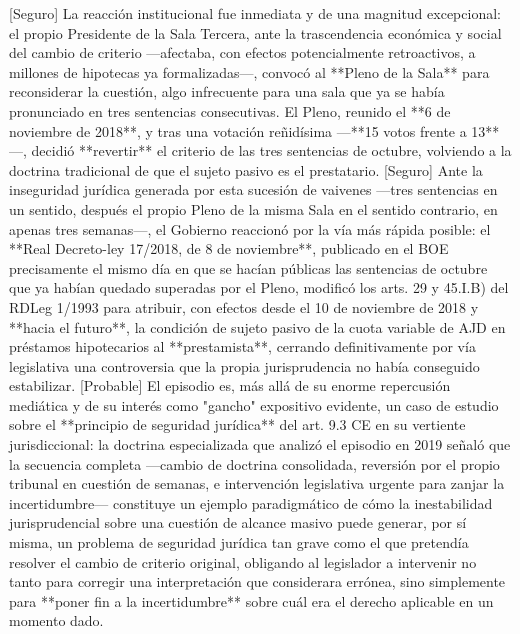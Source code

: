 \documentclass[10pt,a4paper]{article}
\begin{document}
[Seguro] La reacción institucional fue inmediata y de una magnitud excepcional: el propio Presidente de la Sala Tercera, ante la trascendencia económica y social del cambio de criterio —afectaba, con efectos potencialmente retroactivos, a millones de hipotecas ya formalizadas—, convocó al **Pleno de la Sala** para reconsiderar la cuestión, algo infrecuente para una sala que ya se había pronunciado en tres sentencias consecutivas. El Pleno, reunido el **6 de noviembre de 2018**, y tras una votación reñidísima —**15 votos frente a 13**—, decidió **revertir** el criterio de las tres sentencias de octubre, volviendo a la doctrina tradicional de que el sujeto pasivo es el prestatario. [Seguro] Ante la inseguridad jurídica generada por esta sucesión de vaivenes —tres sentencias en un sentido, después el propio Pleno de la misma Sala en el sentido contrario, en apenas tres semanas—, el Gobierno reaccionó por la vía más rápida posible: el **Real Decreto-ley 17/2018, de 8 de noviembre**, publicado en el BOE precisamente el mismo día en que se hacían públicas las sentencias de octubre que ya habían quedado superadas por el Pleno, modificó los arts. 29 y 45.I.B) del RDLeg 1/1993 para atribuir, con efectos desde el 10 de noviembre de 2018 y **hacia el futuro**, la condición de sujeto pasivo de la cuota variable de AJD en préstamos hipotecarios al **prestamista**, cerrando definitivamente por vía legislativa una controversia que la propia jurisprudencia no había conseguido estabilizar. [Probable] El episodio es, más allá de su enorme repercusión mediática y de su interés como "gancho" expositivo evidente, un caso de estudio sobre el **principio de seguridad jurídica** del art. 9.3 CE en su vertiente jurisdiccional: la doctrina especializada que analizó el episodio en 2019 señaló que la secuencia completa —cambio de doctrina consolidada, reversión por el propio tribunal en cuestión de semanas, e intervención legislativa urgente para zanjar la incertidumbre— constituye un ejemplo paradigmático de cómo la inestabilidad jurisprudencial sobre una cuestión de alcance masivo puede generar, por sí misma, un problema de seguridad jurídica tan grave como el que pretendía resolver el cambio de criterio original, obligando al legislador a intervenir no tanto para corregir una interpretación que considerara errónea, sino simplemente para **poner fin a la incertidumbre** sobre cuál era el derecho aplicable en un momento dado.
\end{document}
